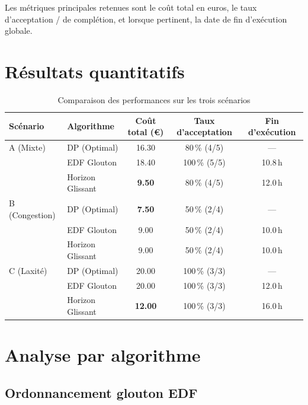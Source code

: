 \documentclass[12pt,a4paper]{report}
\begin{document}
Les métriques principales retenues sont le coût total en euros, le taux d’acceptation / de complétion, et lorsque pertinent, la date de fin d’exécution globale.

\section{Résultats quantitatifs}

\begin{table}[ht]
    \centering
    \caption{Comparaison des performances sur les trois scénarios}
    \label{tab:resultats-performances}
    \begin{tabular}{@{} l l S[table-format=2.2] S[table-format=3.0] S[table-format=2.1] @{}}
        \toprule
        {Scénario} & {Algorithme} & {Coût total (€)} & {Taux d’acceptation} & {Fin d’exécution} \\
        \midrule
        A (Mixte)   & DP (Optimal)      & 16.30 & 80\,\% (4/5)  & —       \\
                    & EDF Glouton       & 18.40 & 100\,\% (5/5) & 10.8\,h \\
                    & Horizon Glissant  & \textbf{9.50} & 80\,\% (4/5)  & 12.0\,h \\
        \midrule
        B (Congestion) 
                    & DP (Optimal)      & \textbf{7.50} & 50\,\% (2/4)  & —       \\
                    & EDF Glouton       & 9.00  & 50\,\% (2/4)  & 10.0\,h \\
                    & Horizon Glissant  & 9.00  & 50\,\% (2/4)  & 10.0\,h \\
        \midrule
        C (Laxité)  & DP (Optimal)      & 20.00 & 100\,\% (3/3) & —       \\
                    & EDF Glouton       & 20.00 & 100\,\% (3/3) & 12.0\,h \\
                    & Horizon Glissant  & \textbf{12.00}& 100\,\% (3/3) & 16.0\,h \\
        \bottomrule
    \end{tabular}
\end{table}

\section{Analyse par algorithme}

\subsection{Ordonnancement glouton EDF}
\end{document}
